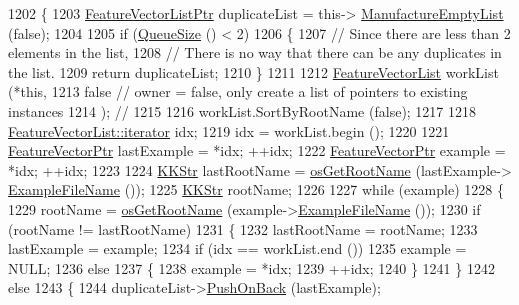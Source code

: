 \begin{DoxyCode}
1202 \{
1203   \hyperlink{class_k_k_m_l_l_1_1_feature_vector_list}{FeatureVectorListPtr}  duplicateList = this->
      \hyperlink{class_k_k_m_l_l_1_1_feature_vector_list_af533da1b34e4123f4fcb1343d5f48e37}{ManufactureEmptyList} (\textcolor{keyword}{false});
1204 
1205   \textcolor{keywordflow}{if}  (\hyperlink{class_k_k_b_1_1_k_k_queue_a1dab601f75ee6a65d97f02bddf71c40d}{QueueSize} () < 2)
1206   \{
1207     \textcolor{comment}{// Since there are less than 2 elements in the list,  }
1208     \textcolor{comment}{// There is no way that there can be any duplicates in the list.}
1209     \textcolor{keywordflow}{return}  duplicateList;
1210   \}
1211 
1212   \hyperlink{class_k_k_m_l_l_1_1_feature_vector_list}{FeatureVectorList}  workList (*\textcolor{keyword}{this}, 
1213                                \textcolor{keyword}{false}    \textcolor{comment}{// owner = false,  only create a list of pointers to existing
       instances}
1214                               );  \textcolor{comment}{// }
1215 
1216   workList.SortByRootName (\textcolor{keyword}{false});
1217   
1218   \hyperlink{class_k_k_b_1_1_k_k_queue_aa3c2796a726eea468b94132a9fbf2cfe}{FeatureVectorList::iterator}  idx;
1219   idx = workList.begin ();
1220 
1221   \hyperlink{class_k_k_m_l_l_1_1_feature_vector}{FeatureVectorPtr}  lastExample = *idx;  ++idx;
1222   \hyperlink{class_k_k_m_l_l_1_1_feature_vector}{FeatureVectorPtr}  example   = *idx;  ++idx;
1223 
1224   \hyperlink{class_k_k_b_1_1_k_k_str}{KKStr}  lastRootName = \hyperlink{namespace_k_k_b_af5b668ed9902d7f93b62529664a739f0}{osGetRootName} (lastExample->
      \hyperlink{class_k_k_m_l_l_1_1_feature_vector_ab47c89ab1e9396664fdc0dc34b6e1ab5}{ExampleFileName} ());
1225   \hyperlink{class_k_k_b_1_1_k_k_str}{KKStr}  rootName;
1226 
1227   \textcolor{keywordflow}{while}  (example)
1228   \{
1229     rootName = \hyperlink{namespace_k_k_b_af5b668ed9902d7f93b62529664a739f0}{osGetRootName} (example->\hyperlink{class_k_k_m_l_l_1_1_feature_vector_ab47c89ab1e9396664fdc0dc34b6e1ab5}{ExampleFileName} ());
1230     \textcolor{keywordflow}{if}  (rootName != lastRootName)
1231     \{
1232       lastRootName = rootName;
1233       lastExample    = example;
1234       \textcolor{keywordflow}{if}  (idx == workList.end ())
1235         example = NULL;
1236       \textcolor{keywordflow}{else}
1237       \{
1238         example = *idx;
1239         ++idx;
1240       \}
1241     \}
1242     \textcolor{keywordflow}{else}
1243     \{
1244       duplicateList->\hyperlink{class_k_k_m_l_l_1_1_feature_vector_list_abd43779a90a6aa3db1de8092be877bdb}{PushOnBack} (lastExample);

\end{DoxyCode}
